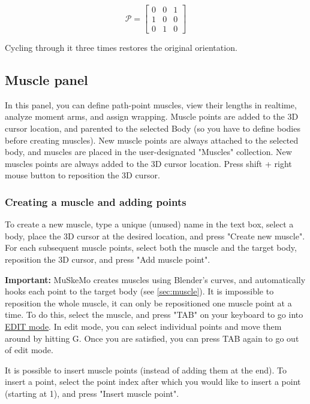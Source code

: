 \documentclass{article}
\begin{document}
\begin{equation}
\mathcal{P} =
\begin{bmatrix}
0 & 0 & 1 \\
1 & 0 & 0 \\
0 & 1 & 0
\end{bmatrix}
\end{equation}


Cycling through it three times restores the original orientation.

\subsection{Muscle panel}
\label{sec:musclepanel}
In this panel, you can define path-point muscles, view their lengths in realtime, analyze moment arms, and assign wrapping. Muscle points are added to the 3D cursor location, and parented to the selected Body (so you have to define bodies before creating muscles). New muscle points are always attached to the selected body, and muscles are placed in the user-designated "Muscles" collection. New muscles points are always added to the 3D cursor location. Press shift + right mouse button to reposition the 3D cursor. 

\subsubsection{Creating a muscle and adding points}

To create a new muscle, type a unique (unused) name in the text box, select a body, place the 3D cursor at the desired location, and press "Create new muscle". For each subsequent muscle points, select both the muscle and the target body, reposition the 3D cursor, and press "Add muscle point".

\textbf{Important:} MuSkeMo creates muscles using Blender's curves, and automatically hooks each point to the target body (see \ref{sec:muscle}). It is impossible to reposition the whole muscle, it can only be repositioned one muscle point at a time. To do this, select the muscle, and press "TAB" on your keyboard to go into \href{https://docs.blender.org/manual/en/latest/editors/3dview/modes.html}{EDIT mode}. In edit mode, you can select individual points and move them around by hitting G. Once you are satisfied, you can press TAB again to go out of edit mode.

It is possible to insert muscle points (instead of adding them at the end). To insert a point, select the point index after which you would like to insert a point (starting at 1), and press "Insert muscle point".
\end{document}
